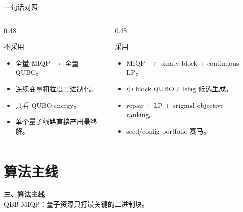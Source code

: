 \documentclass[aspectratio=169]{beamer}
\newcommand{\sectionframe}[2]{
\begin{frame}[plain]
  \vfill
  \begin{center}
    {\Large\bfseries #1}\\[2mm]
    {\small #2}
  \end{center}
  \vfill
\end{frame}
}
\begin{document}
\begin{frame}{一句话对照}
\small
\begin{columns}[T,onlytextwidth]
\begin{column}{0.48\textwidth}
\begin{block}{不采用}
\begin{itemize}
  \item 全量 MIQP $\rightarrow$ 全量 QUBO。
  \item 连续变量粗粒度二进制化。
  \item 只看 QUBO energy。
  \item 单个量子线路直接产出最终解。
\end{itemize}
\end{block}
\end{column}
\begin{column}{0.48\textwidth}
\begin{alertblock}{采用}
\begin{itemize}
  \item MIQP $\rightarrow$ binary block + continuous LP。
  \item 小 block QUBO / Ising 候选生成。
  \item repair + LP + original objective ranking。
  \item seed/config portfolio 赛马。
\end{itemize}
\end{alertblock}
\end{column}
\end{columns}
\end{frame}

\section{算法主线}
\sectionframe{三、算法主线}{QBB-MIQP：量子资源只打最关键的二进制块。}
\end{document}
